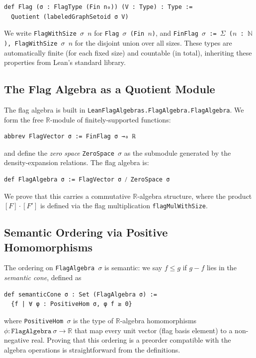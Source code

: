 \documentclass{article}
\newcommand{\R}{\mathbb{R}}
\newcommand{\N}{\mathbb{N}}
\newcommand{\lean}[1]{\texttt{#1}}
\begin{document}
\begin{lstlisting}
def Flag (σ : FlagType (Fin n₀)) (V : Type) : Type :=
  Quotient (labeledGraphSetoid σ V)
\end{lstlisting}

We write \lean{FlagWithSize $\sigma$ $n$} for \lean{Flag $\sigma$ (Fin $n$)},
and \lean{FinFlag $\sigma$ := $\Sigma$ ($n$ : $\N$), FlagWithSize $\sigma$ $n$}
for the disjoint union over all sizes.  These types are automatically finite
(for each fixed size) and countable (in total), inheriting these properties from
Lean's standard library.

\subsection{The Flag Algebra as a Quotient Module}

The flag algebra is built in \lean{LeanFlagAlgebras.FlagAlgebra.FlagAlgebra}.
We form the free $\R$-module of finitely-supported functions:
\begin{lstlisting}
abbrev FlagVector σ := FinFlag σ →₀ ℝ
\end{lstlisting}
and define the \emph{zero space} \lean{ZeroSpace $\sigma$} as the submodule
generated by the density-expansion relations.  The flag algebra is:
\begin{lstlisting}
def FlagAlgebra σ := FlagVector σ ⧸ ZeroSpace σ
\end{lstlisting}
We prove that this carries a commutative $\R$-algebra structure, where the
product $[F] \cdot [F']$ is defined via the flag multiplication
\lean{flagMulWithSize}.

\subsection{Semantic Ordering via Positive Homomorphisms}

The ordering on \lean{FlagAlgebra $\sigma$} is semantic: we say $f \leq g$ if
$g - f$ lies in the \emph{semantic cone}, defined as
\begin{lstlisting}
def semanticCone σ : Set (FlagAlgebra σ) :=
  {f | ∀ φ : PositiveHom σ, φ f ≥ 0}
\end{lstlisting}
where \lean{PositiveHom $\sigma$} is the type of $\R$-algebra homomorphisms
$\phi : \lean{FlagAlgebra}\ \sigma \to \R$ that map every unit vector
(flag basis element) to a non-negative real.  Proving that this ordering is a
preorder compatible with the algebra operations is straightforward from the
definitions.
\end{document}
